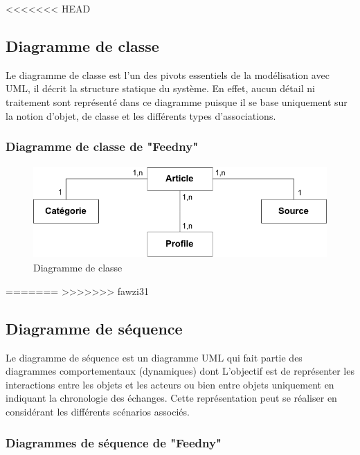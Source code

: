 <<<<<<< HEAD
\subsection{Diagramme de classe}
Le diagramme de classe est l'un des pivots essentiels de la modélisation avec UML, il décrit la structure statique du système. En effet, aucun détail ni traitement sont représenté dans ce diagramme puisque il 
se base uniquement sur la notion d'objet, de classe et les différents types d'associations.\cite{UML}

\subsubsection{Diagramme de classe de "Feedny"}
\begin{figure}[H]
    \centering
    \includegraphics[height=100pt,width=320pt]{img/chapter3/classdiagram.png}
    \caption{Diagramme de classe}
\end{figure}

=======
>>>>>>> fawzi31
\subsection{Diagramme de séquence}
Le diagramme de séquence est un diagramme UML qui fait partie des diagrammes comportementaux (dynamiques) dont L'objectif est de représenter les interactions entre les objets et les acteurs ou bien entre objets uniquement  en indiquant la chronologie des échanges. Cette représentation peut se réaliser en considérant les différents scénarios associés.\cite{UML}


\subsubsection{Diagrammes de séquence de "Feedny"}

